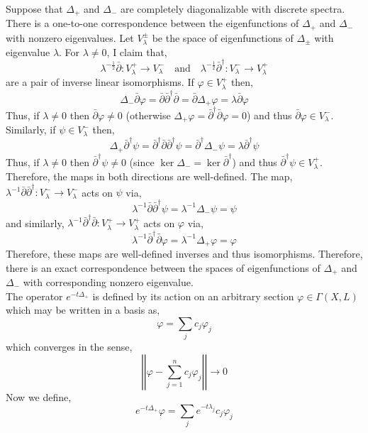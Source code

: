 \documentclass[12pt]{extarticle}
\theoremstyle{definition}
\begin{document}
Suppose that $\Delta_{+}$ and $\Delta_{-}$ are completely diagonalizable with discrete spectra. There is a one-to-one correspondence between the eigenfunctions of $\Delta_{+}$ and $\Delta_{-}$ with nonzero eigenvalues. Let $V^{\pm}_{\lambda}$ be the space of eigenfunctions of $\Delta_{\pm}$ with eigenvalue $\lambda$. For $\lambda \neq 0$, I claim that,
\[ \lambda^{-\frac{1}{2}} \bar{\partial} : V^{+}_{\lambda} \to V^{-}_{\lambda} \quad \text{and} \quad \lambda^{-\frac{1}{2}} \bar{\partial}^\dagger : V^{-}_{\lambda} \to V^{+}_{\lambda} \]
are a pair of inverse linear isomorphisms. 
If $\varphi \in V^{+}_{\lambda}$ then,
\[ \Delta_{-} \bar{\partial} \varphi = \bar{\partial} \bar{\partial}^\dagger \bar{\partial} = \bar{\partial} \Delta_{+} \varphi = \lambda \bar{\partial} \varphi \]
Thus, if $\lambda \neq 0$ then $\bar{\partial} \varphi \neq 0$ (otherwise $\Delta_{+} \varphi = \bar{\partial}^\dagger \bar{\partial} \varphi = 0$) and thus $\bar{\partial} \varphi \in V^{-}_{\lambda}$. Similarly, if $\psi \in V^{-}_\lambda$ then,
\[ \Delta_{+} \bar{\partial}^\dagger \psi = \bar{\partial}^\dagger \bar{\partial} \bar{\partial}^\dagger \psi = \bar{\partial}^\dagger \Delta_{-} \psi = \lambda \bar{\partial}^{\dagger} \psi \]
Thus, if $\lambda \neq 0$ then $\bar{\partial}^\dagger \psi \neq 0$ (since $\ker{\Delta_{-}} = \ker{\bar{\partial}^\dagger}$) and thus $\bar{\partial}^\dagger \psi \in V^{+}_{\lambda}$. 
\bigskip\\
Therefore, the maps in both directions are well-defined. The map,  $\lambda^{-1} \bar{\partial} \bar{\partial}^\dagger : V_{\lambda}^{-} \to V_{\lambda}^{-}$ acts on $\psi$ via,
\[ \lambda^{-1} \bar{\partial} \bar{\partial}^\dagger \psi = \lambda^{-1} \Delta_{-} \psi = \psi \]
and similarly, $\lambda^{-1} \bar{\partial}^\dagger \bar{\partial} : V_{\lambda}^{+} \to V_{\lambda}^{+}$ acts on $\varphi$ via,
\[ \lambda^{-1} \bar{\partial}^\dagger \bar{\partial} \varphi = \lambda^{-1} \Delta_{+} \varphi = \varphi \]
Therefore, these maps are well-defined inverses and thus isomorphisms. Therefore, there is an exact correspondence between the spaces of eigenfunctions of $\Delta_{+}$ and $\Delta_{-}$ with corresponding nonzero eigenvalue. 
\bigskip\\
The operator $e^{- t \Delta_{+}}$ is defined by its action on an arbitrary section $\varphi \in \Gamma(X, L)$ which may be written in a basis as,
\[ \varphi = \sum_{j} c_j \varphi_j \]
which converges in the sense,
\[ \left| \left| \varphi - \sum_{j = 1}^n c_j \varphi_j \right| \right| \to 0 \]
Now we define,
\[ e^{-t \Delta_{+}} \varphi = \sum_j e^{- t \lambda_j} c_j \varphi_j \] 
\end{document}
